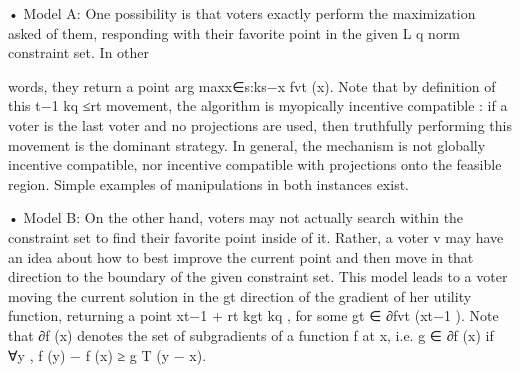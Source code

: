 \documentclass[10pt]{article}
\begin{document}
\begin{ReviewVerbatim}
• Model A:       One possibility is that voters exactly perform the maximization asked of
  them, responding with their favorite point in the given L
                                                                       q norm constraint set. In other

  words, they return a point arg maxx∈{s:ks−x                    fvt (x). Note that by definition of this
                                                  t−1 kq ≤rt }
  movement, the algorithm is     myopically incentive compatible : if a voter is the last voter
  and no projections are used, then truthfully performing this movement is the dominant
  strategy.   In general, the mechanism is not globally incentive compatible, nor incentive
  compatible with projections onto the feasible region. Simple examples of manipulations
  in both instances exist.



• Model B:       On the other hand, voters may not actually search within the constraint set
  to find their favorite point inside of it. Rather, a voter v may have an idea about how
  to best improve the current point and then move in that direction to the boundary of
  the given constraint set. This model leads to a voter moving the current solution in the
                                                                                           gt
  direction of the gradient of her utility function, returning a point xt−1 + rt
                                                                                         kgt kq , for some
  gt ∈ ∂fvt (xt−1 ). Note that ∂f (x) denotes the set of subgradients of a function f at x, i.e.
  g ∈ ∂f (x) if ∀y , f (y) − f (x) ≥ g T (y − x).
\end{ReviewVerbatim}
\end{document}
